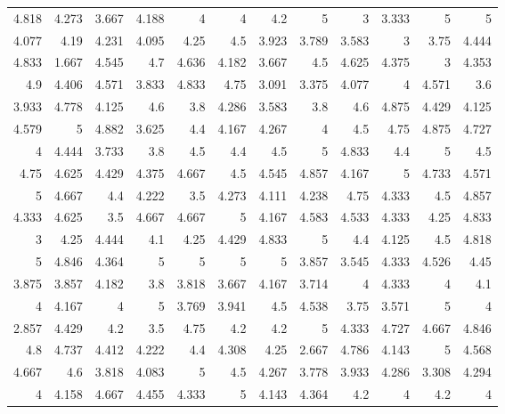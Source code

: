 \documentclass[10pt]{report}
\begin{document}
\begin{table}[!htbp]
    \centering
	\begin{tabular}{rrrrrrrrrrrr}
	
	\hline
	4.818 & 4.273 & 3.667 & 4.188 & 4     & 4     & 4.2   & 5     & 3     & 3.333 & 5     & 5     \\
	4.077 & 4.19  & 4.231 & 4.095 & 4.25  & 4.5   & 3.923 & 3.789 & 3.583 & 3     & 3.75  & 4.444 \\
	4.833 & 1.667 & 4.545 & 4.7   & 4.636 & 4.182 & 3.667 & 4.5   & 4.625 & 4.375 & 3     & 4.353 \\
	4.9   & 4.406 & 4.571 & 3.833 & 4.833 & 4.75  & 3.091 & 3.375 & 4.077 & 4     & 4.571 & 3.6   \\
	3.933 & 4.778 & 4.125 & 4.6   & 3.8   & 4.286 & 3.583 & 3.8   & 4.6   & 4.875 & 4.429 & 4.125 \\
	4.579 & 5     & 4.882 & 3.625 & 4.4   & 4.167 & 4.267 & 4     & 4.5   & 4.75  & 4.875 & 4.727 \\
	4     & 4.444 & 3.733 & 3.8   & 4.5   & 4.4   & 4.5   & 5     & 4.833 & 4.4   & 5     & 4.5   \\
	4.75  & 4.625 & 4.429 & 4.375 & 4.667 & 4.5   & 4.545 & 4.857 & 4.167 & 5     & 4.733 & 4.571 \\
	5     & 4.667 & 4.4   & 4.222 & 3.5   & 4.273 & 4.111 & 4.238 & 4.75  & 4.333 & 4.5   & 4.857 \\
	4.333 & 4.625 & 3.5   & 4.667 & 4.667 & 5     & 4.167 & 4.583 & 4.533 & 4.333 & 4.25  & 4.833 \\
	3     & 4.25  & 4.444 & 4.1   & 4.25  & 4.429 & 4.833 & 5     & 4.4   & 4.125 & 4.5   & 4.818 \\
	5     & 4.846 & 4.364 & 5     & 5     & 5     & 5     & 3.857 & 3.545 & 4.333 & 4.526 & 4.45  \\
	3.875 & 3.857 & 4.182 & 3.8   & 3.818 & 3.667 & 4.167 & 3.714 & 4     & 4.333 & 4     & 4.1   \\
	4     & 4.167 & 4     & 5     & 3.769 & 3.941 & 4.5   & 4.538 & 3.75  & 3.571 & 5     & 4     \\
	2.857 & 4.429 & 4.2   & 3.5   & 4.75  & 4.2   & 4.2   & 5     & 4.333 & 4.727 & 4.667 & 4.846 \\
	4.8   & 4.737 & 4.412 & 4.222 & 4.4   & 4.308 & 4.25  & 2.667 & 4.786 & 4.143 & 5     & 4.568 \\
	4.667 & 4.6   & 3.818 & 4.083 & 5     & 4.5   & 4.267 & 3.778 & 3.933 & 4.286 & 3.308 & 4.294 \\
	4     & 4.158 & 4.667 & 4.455 & 4.333 & 5     & 4.143 & 4.364 & 4.2   & 4     & 4.2   & 4     \\

\end{tabular}
\end{table}
\end{document}
